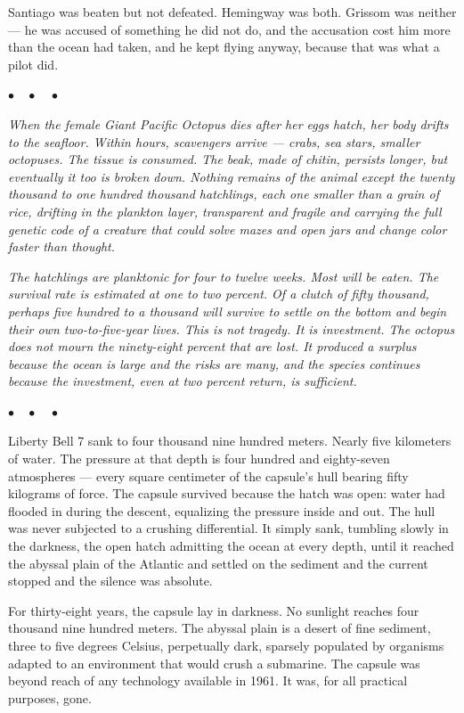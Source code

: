 \documentclass[12pt, letterpaper]{article}
\begin{document}
Santiago was beaten but not defeated. Hemingway was both. Grissom was neither --- he was accused of something he did not do, and the accusation cost him more than the ocean had taken, and he kept flying anyway, because that was what a pilot did.

\begin{center}
$\bullet\quad\bullet\quad\bullet$
\end{center}

\emph{When the female Giant Pacific Octopus dies after her eggs hatch, her body drifts to the seafloor. Within hours, scavengers arrive --- crabs, sea stars, smaller octopuses. The tissue is consumed. The beak, made of chitin, persists longer, but eventually it too is broken down. Nothing remains of the animal except the twenty thousand to one hundred thousand hatchlings, each one smaller than a grain of rice, drifting in the plankton layer, transparent and fragile and carrying the full genetic code of a creature that could solve mazes and open jars and change color faster than thought.}

\emph{The hatchlings are planktonic for four to twelve weeks. Most will be eaten. The survival rate is estimated at one to two percent. Of a clutch of fifty thousand, perhaps five hundred to a thousand will survive to settle on the bottom and begin their own two-to-five-year lives. This is not tragedy. It is investment. The octopus does not mourn the ninety-eight percent that are lost. It produced a surplus because the ocean is large and the risks are many, and the species continues because the investment, even at two percent return, is sufficient.}

\begin{center}
$\bullet\quad\bullet\quad\bullet$
\end{center}

Liberty Bell 7 sank to four thousand nine hundred meters. Nearly five kilometers of water. The pressure at that depth is four hundred and eighty-seven atmospheres --- every square centimeter of the capsule's hull bearing fifty kilograms of force. The capsule survived because the hatch was open: water had flooded in during the descent, equalizing the pressure inside and out. The hull was never subjected to a crushing differential. It simply sank, tumbling slowly in the darkness, the open hatch admitting the ocean at every depth, until it reached the abyssal plain of the Atlantic and settled on the sediment and the current stopped and the silence was absolute.

For thirty-eight years, the capsule lay in darkness. No sunlight reaches four thousand nine hundred meters. The abyssal plain is a desert of fine sediment, three to five degrees Celsius, perpetually dark, sparsely populated by organisms adapted to an environment that would crush a submarine. The capsule was beyond reach of any technology available in 1961. It was, for all practical purposes, gone.
\end{document}
